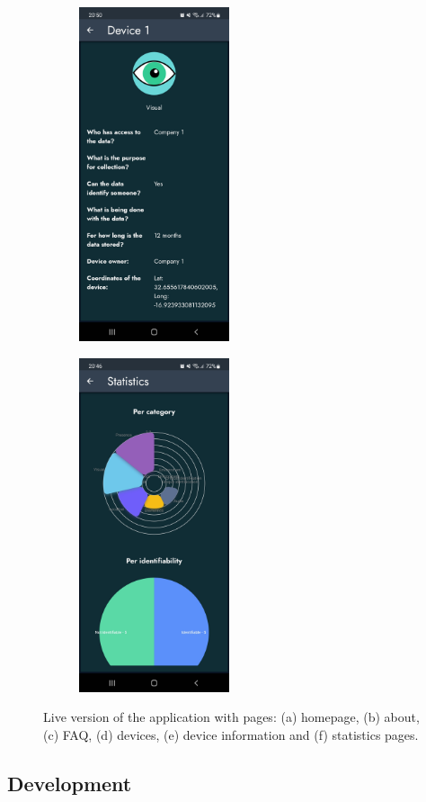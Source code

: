 \begin{figure}[H]
\begin{subfigure}{0.30\textwidth}
        \includegraphics[width=125pt]{../assets/images/live_device_info.jpg}
        \caption{}
        \label{fig:live_device_info}
    \end{subfigure}
    \begin{subfigure}{0.30\textwidth}
        \centering
        \includegraphics[width=125pt]{../assets/images/live_statistics.jpg}
        \caption{}
        \label{fig:live_statistics}
    \end{subfigure}
    \caption{Live version of the application with pages: (a) homepage, (b) about, (c) FAQ, (d) devices, (e) device information and (f) statistics pages.}
    \label{fig:live_app}
\end{figure}

\subsection{Development}

